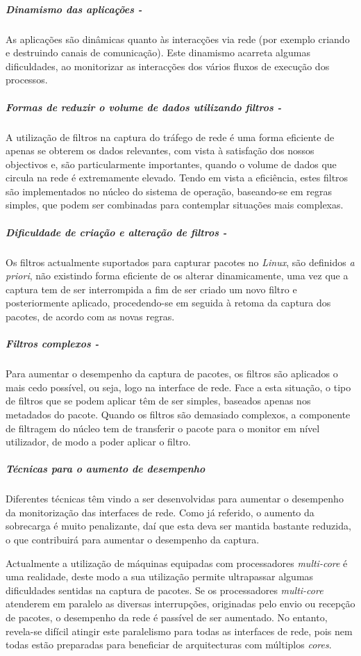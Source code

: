 \subparagraph*{Dinamismo das aplicações - }
As aplicações são dinâmicas quanto às interacções via rede (por exemplo criando e destruindo canais de comunicação).
Este dinamismo acarreta algumas dificuldades, ao monitorizar as interacções dos vários fluxos de execução dos processos.

\subparagraph*{Formas de reduzir o volume de dados utilizando filtros - }
A utilização de filtros na captura do tráfego de rede é uma forma eficiente de apenas se obterem os dados relevantes, com vista à satisfação dos nossos objectivos e, são particularmente importantes, quando o volume de dados que circula na rede é extremamente elevado.
Tendo em vista a eficiência, estes filtros são implementados no núcleo do sistema de operação, baseando-se em regras simples, que podem ser combinadas para contemplar situações mais complexas.

\subparagraph*{Dificuldade de criação e alteração de filtros - }
Os filtros actualmente suportados para capturar pacotes no \textit{Linux}, são definidos \textit{a priori}, não existindo forma eficiente de os alterar dinamicamente, uma vez que a captura tem de ser interrompida a fim de ser criado um novo filtro e posteriormente aplicado, procedendo-se em seguida à retoma da captura dos pacotes, de acordo com as novas regras.

\subparagraph*{Filtros complexos - }
Para aumentar o desempenho da captura de pacotes, os filtros são aplicados o mais cedo possível, ou seja, logo na interface de rede.
Face a esta situação, o tipo de filtros que se podem aplicar têm de ser simples, baseados apenas nos metadados do pacote.
Quando os filtros são demasiado complexos, a componente de filtragem do núcleo tem de transferir o pacote para o monitor em nível utilizador, de modo a poder aplicar o filtro.

\subparagraph*{Técnicas para o aumento de desempenho}

Diferentes técnicas têm vindo a ser desenvolvidas para aumentar o desempenho da monitorização das interfaces de rede.
Como já referido, o aumento da sobrecarga é muito penalizante, daí que esta deva ser mantida bastante reduzida, o que contribuirá para aumentar o desempenho da captura.

Actualmente a utilização de máquinas equipadas com processadores \textit{multi-core} é uma realidade, deste modo a sua utilização permite ultrapassar algumas dificuldades sentidas na captura de pacotes.
Se os processadores \textit{multi-core} atenderem em paralelo as diversas interrupções, originadas pelo envio ou recepção de pacotes, o desempenho da rede é passível de ser aumentado.
No entanto, revela-se difícil atingir este paralelismo para todas as interfaces de rede, pois nem todas estão preparadas para beneficiar de arquitecturas com múltiplos \textit{cores}.

